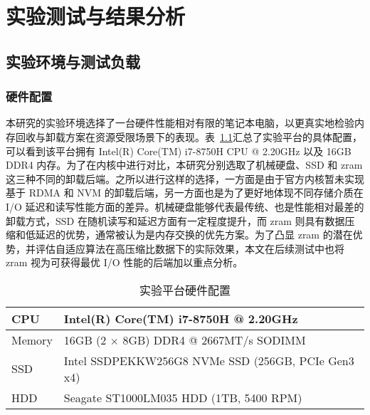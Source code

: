 

\chapter{实验测试与结果分析}

\section{实验环境与测试负载}

\subsection{硬件配置}

本研究的实验环境选择了一台硬件性能相对有限的笔记本电脑，以更真实地检验内存回收与卸载方案在资源受限场景下的表现。表~\ref{tab:hardware_config}汇总了实验平台的具体配置，可以看到该平台拥有 Intel(R) Core(TM) i7-8750H CPU @ 2.20GHz 以及 16GB DDR4 内存。为了在内核中进行对比，本研究分别选取了机械硬盘、SSD 和 zram 这三种不同的卸载后端。之所以进行这样的选择，一方面是由于官方内核暂未实现基于 RDMA 和 NVM 的卸载后端，另一方面也是为了更好地体现不同存储介质在 I/O 延迟和读写性能方面的差异。机械硬盘能够代表最传统、也是性能相对最差的卸载方式，SSD 在随机读写和延迟方面有一定程度提升，而 zram 则具有数据压缩和低延迟的优势，通常被认为是内存交换的优先方案。为了凸显 zram 的潜在优势，并评估自适应算法在高压缩比数据下的实际效果，本文在后续测试中也将 zram 视为可获得最优 I/O 性能的后端加以重点分析。

\begin{table}[h]
    \centering
    \caption{实验平台硬件配置}
    \label{tab:hardware_config}
    \begin{tabular}{ll}
        \toprule
        CPU & Intel(R) Core(TM) i7-8750H @ 2.20GHz \\
        \midrule
        Memory & 16GB (2 \(\times\) 8GB) DDR4 @ 2667MT/s SODIMM \\
        \midrule
        SSD & Intel SSDPEKKW256G8 NVMe SSD (256GB, PCIe Gen3 x4)  \\
        \midrule
        HDD & Seagate ST1000LM035 HDD (1TB, 5400 RPM) \\
        \bottomrule
    \end{tabular}
\end{table}

